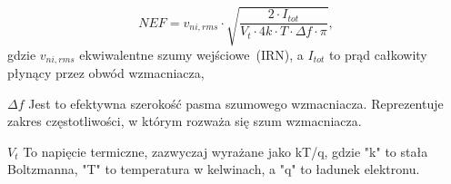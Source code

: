 \begin{frame}[t]
    \begin{block}{\dk}
    \end{block}
    \begin{equation}
        NEF = v_{ni,rms}\cdot\sqrt{\frac{2\cdot I_{tot}}{V_t\cdot 4k\cdot T \cdot \Delta f \cdot \pi}},
        \label{equ:NEF}
    \end{equation}
    gdzie $v_{ni,rms}$ ekwiwalentne szumy wejściowe~(IRN), a $I_{tot}$ to prąd całkowity płynący przez obwód wzmacniacza, 
    
 
    $\Delta f$ Jest to efektywna szerokość pasma szumowego wzmacniacza. Reprezentuje zakres częstotliwości, w którym rozważa się szum wzmacniacza.

    $V_t$ To napięcie termiczne, zazwyczaj wyrażane jako kT/q, gdzie "k" to stała Boltzmanna, "T" to temperatura w kelwinach, a "q" to ładunek elektronu.


\end{frame}



